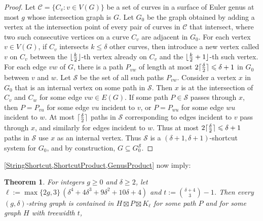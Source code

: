 \documentclass{patmorin}
\theoremstyle{plain}
\newtheorem{thm}{Theorem}
\theoremstyle{definition}
\DeclareMathOperator{\qn}{qn}
\DeclarePairedDelimiter{\ceil}{\lceil}{\rceil}
\DeclarePairedDelimiter{\floor}{\lfloor}{\rfloor}
\renewcommand{\SS}{\mathcal{S}}
\renewcommand{\geq}{\geqslant}
\renewcommand{\leq}{\leqslant}
\begin{document}
\begin{proof}
Let $\mathcal{C}=\{C_v:v\in V(G)\}$ be a set of curves in a surface of Euler genus at most $g$ whose intersection graph is $G$.  Let $G_0$ be the graph obtained by adding a vertex at the intersection point of every pair of curves in $\mathcal{C}$ that intersect,  where two such consecutive vertices on a curve $C_v$ are adjacent in $G_0$. For each vertex $v\in V(G)$, if $C_v$ intersects $k\leq\delta$ other curves, then introduce a new vertex called $v$ on $C_v$ between the
$\floor{\frac{k}{2}}$-th vertex already on $C_v$ and the $\floor{\frac{k}{2}+1}$-th such vertex. For each edge $vw$ of $G$, there is a path $P_{vw}$ of length at most $2\ceil{\frac{\delta}{2}}\leq \delta+1$ in $G_0$ between $v$ and $w$. Let $\SS$ be the set of all such paths $P_{vw}$. Consider a vertex $x$ in $G_0$ that is an internal vertex on some path in $\SS$. Then $x$ is at the intersection of $C_v$ and $C_w$ for some edge $vw\in E(G)$. If some path $P\in \SS$ passes through $x$, then $P=P_{vu}$ for some edge $vu$ incident to $v$, or $P=P_{wu}$ for some edge $wu$ incident to $w$. At most $\ceil{\frac{\delta}{2}}$ paths in $\SS$ corresponding to edges incident to $v$ pass through $x$, and similarly for edges incident to $w$. Thus at most $2\ceil{\frac{\delta}{2}}\leq\delta+1$ paths in $\SS$ use $x$ as an internal vertex. Thus $\SS$ is a $(\delta+1,\delta+1)$-shortcut system for $G_0$, and by construction, $G \subseteq G_0^\SS$.
\end{proof}


\cref{StringShortcut,ShortcutProduct,GenusProduct} now imply:

\begin{thm}\label{StringProduct}
For integers $g\geq 0$ and $\delta\geq 2$, let $\ell:= \max\{2g,3\} \,(\delta^4 + 4 \delta^3 + 9 \delta^2 + 10 \delta + 4)$ and $t:= \binom{ \delta+4}{3}-1$.
Then  every $(g,\delta)$-string graph is contained in $H\boxtimes P \boxtimes K_{\ell}$ for some path $P$ and for some graph $H$ with treewidth $t$,
\end{thm}


\end{document}
